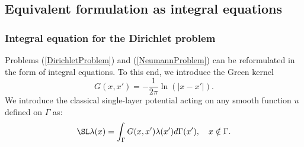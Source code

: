 \documentclass[10pt,a4paper]{article}
\begin{document}
\subsection*{Equivalent formulation as integral equations}

\subsubsection*{Integral equation for the Dirichlet problem}

Problems (\ref{DirichletProblem}) and (\ref{NeumannProblem}) can be reformulated in the form of integral equations. To this end, we introduce the Green kernel 
\[G(x,x') = -\frac{1}{2\pi}\ln(|x-x'|).\] 
We introduce the classical single-layer potential acting on any smooth function $u$ defined on $\Gamma$ as:
\begin{equation}
\SL \lambda(x) = \int_\Gamma G(x,x')\lambda(x')d\Gamma(x'), \quad x \notin \Gamma.
\label{SLuDef}
\end{equation}
\end{document}
